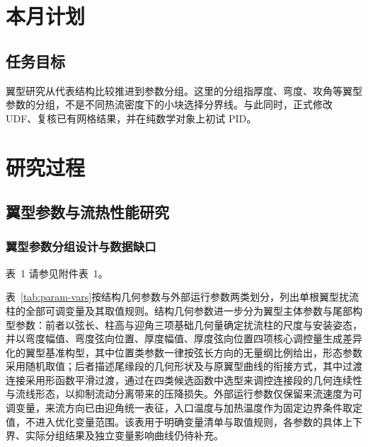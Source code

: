 \documentclass[stage2,fontset=fandol]{ydzjreport}
\makeatletter
\newcommand{\submissionnumber}[1]{\def\@currentlabel{#1}}
\makeatother
\begin{document}
\makestagetwohead

\section{本月计划}

\subsection{任务目标}

翼型研究从代表结构比较推进到参数分组。这里的分组指厚度、弯度、攻角等翼型参数的分组，不是不同热流密度下的小块选择分界线。与此同时，正式修改 UDF、复核已有网格结果，并在纯数学对象上初试 PID。

\section{研究过程}

\subsection{翼型参数与流热性能研究}

\subsubsection{翼型参数分组设计与数据缺口}



\par\noindent \begingroup\submissionnumber{1}\label{tab:param-vars}\endgroup 表~1 请参见附件表~1。\par


表~\ref{tab:param-vars}按结构几何参数与外部运行参数两类划分，列出单根翼型扰流柱的全部可调变量及其取值规则。结构几何参数进一步分为翼型主体参数与尾部构型参数：前者以弦长、柱高与迎角三项基础几何量确定扰流柱的尺度与安装姿态，并以弯度幅值、弯度弦向位置、厚度幅值、厚度弦向位置四项核心调控量生成差异化的翼型基准构型，其中位置类参数一律按弦长方向的无量纲比例给出，形态参数采用随机取值；后者描述尾缘段的几何形状及与原翼型曲线的衔接方式，其中过渡连接采用形函数平滑过渡，通过在四类候选函数中选型来调控连接段的几何连续性与流线形态，以抑制流动分离带来的压降损失。外部运行参数仅保留来流速度为可调变量，来流方向已由迎角统一表征，入口温度与加热温度作为固定边界条件取定值，不进入优化变量范围。该表用于明确变量清单与取值规则，各参数的具体上下界、实际分组结果及独立变量影响曲线仍待补充。
\end{document}
